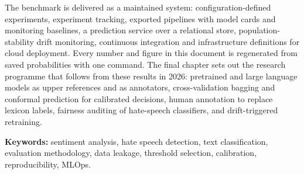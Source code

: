 The benchmark is delivered as a maintained system: configuration-defined experiments, experiment tracking, exported pipelines with model cards and monitoring baselines, a prediction service over a relational store, population-stability drift monitoring, continuous integration and infrastructure definitions for cloud deployment. Every number and figure in this document is regenerated from saved probabilities with one command. The final chapter sets out the research programme that follows from these results in 2026: pretrained and large language models as upper references and as annotators, cross-validation bagging and conformal prediction for calibrated decisions, human annotation to replace lexicon labels, fairness auditing of hate-speech classifiers, and drift-triggered retraining.

\medskip
\noindent\textbf{Keywords:} sentiment analysis, hate speech detection, text classification, evaluation methodology, data leakage, threshold selection, calibration, reproducibility, MLOps.
